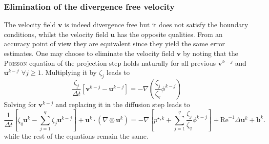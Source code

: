 \documentclass[]{scrartcl}
\newcommand{\bs}[1]{\boldsymbol{#1}}
\begin{document}
\subsubsection{Elimination of the divergence free velocity}
The velocity field $\bs{v}$ is indeed divergence free but it does not satisfy the boundary conditions, whilst the velocity field $\bs{u}$ has the opposite qualities. From an accuracy point of view they are equivalent since they yield the same error estimates. One may choose to eliminate the velocity field $\bs{v}$ by noting that the \textsc{Poisson} equation of the projection step holds naturally for all previous $\bs{v}^{k-j}$ and $\bs{u}^{k-j}$ $\forall j\ge 1$. Multiplying it by $\zeta_j$ leads to
\begin{equation*}
	\dfrac{\zeta_j}{\Delta t} \left[\bs{v}^{k-j} - \bs{u}^{k-j} \right] = -\nabla \left(\dfrac{\zeta_j}{\zeta_q}\phi^{k-j}\right)
\end{equation*}
Solving for $\bs{v}^{k-j}$ and replacing it in the diffusion step leads to
\begin{equation*}
		\dfrac{1}{\Delta t} \left[\zeta_q \bs{u}^{k} - \sum_{j=1}^{q} \zeta_j \bs{u}^{k-j}\right]  + \bs{u}^{k} \cdot (\nabla \otimes \bs{u}^{k}) = -\nabla	\left[p^{\star, k} + \sum_{j=1}^{q} \dfrac{\zeta_j}{\zeta_q}\phi^{k-j} \right] +  \mathrm{Re}^{-1} \Delta \bs{u}^{k} + \bs{b}^{k}.
\end{equation*}
while the rest of the equations remain the same.
\end{document}
